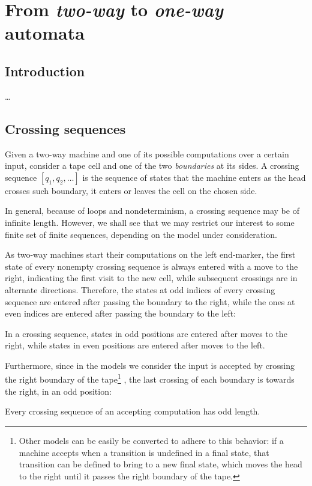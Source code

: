 \chapter{From \emph{two-way} to \emph{one-way} automata}



\section{Introduction}
\dots


\section{Crossing sequences}
Given a two-way machine and one of its possible computations over a certain input, consider a tape cell and one of the two \emph{boundaries} at its sides.
A crossing sequence $[q_1,q_2,\dots]$ is the sequence of states that the machine enters as the head crosses such boundary, \ie it enters or leaves the cell on the chosen side.

In general, because of loops and nondeterminism, a crossing sequence may be of infinite length.
However, we shall see that we may restrict our interest to some finite set of finite sequences, depending on the model under consideration.

As two-way machines start their computations on the left end-marker, the first state of every nonempty crossing sequence is always entered with a move to the right, indicating the first visit to the new cell, while subsequent crossings are in alternate directions.
Therefore, the states at odd indices of every crossing sequence are entered after passing the boundary to the right, while the ones at even indices are entered after passing the boundary to the left:
\begin{fact}\label{fact:crossing-parity}
	In a crossing sequence, states in odd positions are entered after moves to the right, while states in even positions are entered after moves to the left.
\end{fact}

Furthermore, since in the models we consider the input is accepted by crossing the right boundary of the tape\footnote{%
	Other models can be easily be converted to adhere to this behavior: if a machine accepts when a transition is undefined in a final state, that transition can be defined to bring to a new final state, which moves the head to the right until it passes the right boundary of the tape.}%
, the last crossing of each boundary is towards the right, \ie in an odd position:
\begin{fact}\label{fact:crossing-length}
	Every crossing sequence of an accepting computation has odd length.
\end{fact}


